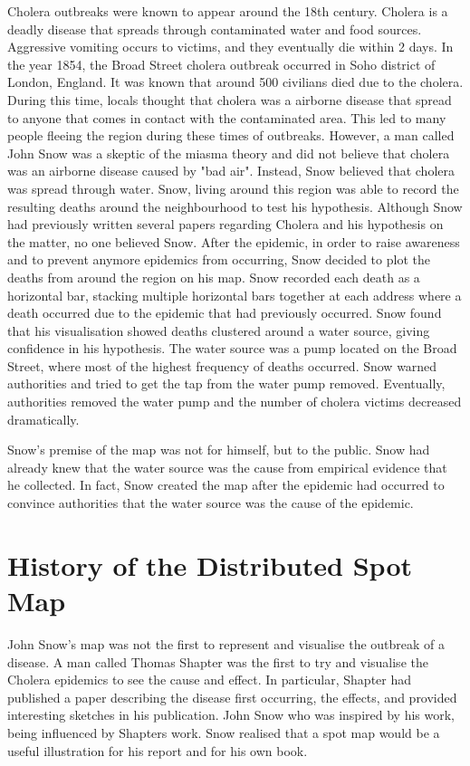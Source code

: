 \documentclass[12pt]{article}
\begin{document}
Cholera outbreaks were known to appear around the 18th century. Cholera is a deadly disease that spreads through contaminated water and food sources. Aggressive vomiting occurs to victims, and they eventually die within 2 days. In the year 1854, the Broad Street cholera outbreak occurred in Soho district of London, England. It was known that around 500 civilians died due to the cholera. During this time, locals thought that cholera was a airborne disease that spread to anyone that comes in contact with the contaminated area. This led to many people fleeing the region during these times of outbreaks. However, a man called John Snow was a skeptic of the miasma theory and did not believe that cholera was an airborne disease caused by "bad air". Instead, Snow believed that cholera was spread through water. Snow, living around this region was able to record the resulting deaths around the neighbourhood to test his hypothesis. Although Snow had previously written several papers regarding Cholera and his hypothesis on the matter, no one believed Snow. After the epidemic, in order to raise awareness and to prevent anymore epidemics from occurring, Snow decided to plot the deaths from around the region on his map. Snow recorded each death as a horizontal bar, stacking multiple horizontal bars together at each address where a death occurred due to the epidemic that had previously occurred. Snow found that his visualisation showed deaths clustered around a water source, giving confidence in his hypothesis. The water source was a pump located on the Broad Street, where most of the highest frequency of deaths occurred. Snow warned authorities and tried to get the tap from the water pump removed. Eventually, authorities removed the water pump and the number of cholera victims decreased dramatically. 

Snow's premise of the map was not for himself, but to the public. Snow had already knew that the water source was the cause from empirical evidence that he collected. In fact, Snow created the map after the epidemic had occurred to convince authorities that the water source was the cause of the epidemic.  

\section{History of the Distributed Spot Map}

John Snow's map was not the first to represent and visualise the outbreak of a disease. A man called Thomas Shapter was the first to try and visualise the Cholera epidemics to see the cause and effect. In particular, Shapter had published a paper describing the disease first occurring, the effects, and provided interesting sketches in his publication. John Snow who was inspired by his work, being influenced by Shapters work. Snow realised that a spot map would be a useful illustration for his report and for his own book.  
\end{document}

